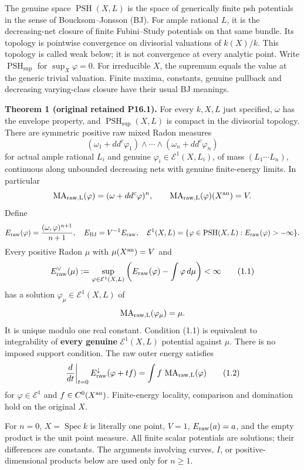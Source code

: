 \documentclass[
  10pt,
]{article}
\begin{document}
The genuine space \(\operatorname{PSH}(X,L)\) is the space of
generically finite psh potentials in the sense of Boucksom--Jonsson
(BJ). For ample rational \(L\), it is the decreasing-net closure of
finite Fubini--Study potentials on that same bundle. Its topology is
pointwise convergence on divisorial valuations of \(k(X)/k\). This
topology is called weak below; it is not convergence at every analytic
point. Write \(\operatorname{PSH}_{\sup}\) for \(\sup_X\varphi=0\). For
irreducible \(X\), the supremum equals the value at the generic trivial
valuation. Finite maxima, constants, genuine pullback and decreasing
varying-class closure have their usual BJ meanings.

\textbf{Theorem 1 (original retained P16.1).} For every \(k,X,L\) just
specified, \(\omega\) has the envelope property, and
\(\operatorname{PSH}_{\sup}(X,L)\) is compact in the divisorial
topology. There are symmetric positive raw mixed Radon measures \[
 (\omega_1+dd^c\varphi_1)\wedge\cdots\wedge(\omega_n+dd^c\varphi_n)
\] for actual ample rational \(L_i\) and genuine
\(\varphi_i\in\mathcal E^1(X,L_i)\), of mass \((L_1\cdots L_n)\),
continuous along unbounded decreasing nets with genuine finite-energy
limits. In particular \[
 \operatorname{MA}_{\rm raw,L}(\varphi)=(\omega+dd^c\varphi)^n,
 \qquad \operatorname{MA}_{\rm raw,L}(\varphi)(X^{\rm an})=V.
\] Define \[
 E_{\rm raw}(\varphi)=\frac{(\omega,\varphi)^{n+1}}{n+1},\quad
 E_{\rm BJ}=V^{-1}E_{\rm raw},\quad
 \mathcal E^1(X,L)=\{\varphi\in\operatorname{PSH}(X,L):E_{\rm raw}(\varphi)>-\infty\}.
\] Every positive Radon \(\mu\) with \(\mu(X^{\rm an})=V\) and \[
 E_{\rm raw}^{\vee}(\mu)
 :=\sup_{\varphi\in\mathcal E^1(X,L)}
       \left(E_{\rm raw}(\varphi)-\int\varphi\,d\mu\right)<\infty
 \tag{1.1}
\] has a solution \(\varphi_\mu\in\mathcal E^1(X,L)\) of
\[\operatorname{MA}_{\rm raw,L}(\varphi_\mu)=\mu.\] It is unique modulo
one real constant. Condition (1.1) is equivalent to integrability of
\textbf{every genuine} \(\mathcal E^1(X,L)\) potential against \(\mu\).
There is no imposed support condition. The raw outer energy satisfies \[
 \left.\frac{d}{dt}\right|_{t=0} E_{\rm raw}^{\downarrow}(\varphi+tf)
       =\int f\,\operatorname{MA}_{\rm raw,L}(\varphi)
 \tag{1.2}
\] for \(\varphi\in\mathcal E^1\) and \(f\in C^0(X^{\rm an})\).
Finite-energy locality, comparison and domination hold on the original
\(X\).

For \(n=0\), \(X=\operatorname{Spec}k\) is literally one point, \(V=1\),
\(E_{\rm raw}(a)=a\), and the empty product is the unit point measure.
All finite scalar potentials are solutions; their differences are
constants. The arguments involving curves, \(I\), or
positive-dimensional products below are used only for \(n\ge1\).
\end{document}
